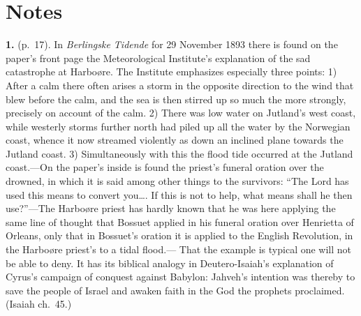 \documentclass[12pt,a4paper]{book}
\newcommand{\opage}[1]{\marginnote{\footnotesize\textit{[#1]}}}
\begin{document}
\chapter*{Notes}
\label{ch:notes}


\newcommand{\note}[1]{\medskip\noindent\textbf{#1.}\quad\ignorespaces}

\note{1}
\opage{245}(p.~17). In \emph{Berlingske Tidende} for 29 November 1893 there is found on the paper's
front page the Meteorological Institute's explanation of the sad catastrophe at Harboøre.
The Institute emphasizes especially three points: 1) After a calm there often arises a
storm in the opposite direction to the wind that blew before the calm, and the sea is then
stirred up so much the more strongly, precisely on account of the calm. 2) There was low
water on Jutland's west coast, while westerly storms further north had piled up all the
water by the Norwegian coast, whence it now streamed violently as down an inclined plane
towards the Jutland coast. 3) Simultaneously with this the flood tide occurred at the
Jutland coast.---On the paper's inside is found the priest's funeral oration over the
drowned, in which it is said among other things to the survivors: ``The Lord has used this
means to convert you\ldots. If this is not to help, what means shall he then use?''---The
Harboøre priest has hardly known that he was here applying the same line of thought that
Bossuet applied in his funeral oration over Henrietta of Orleans, only that in Bossuet's
oration it is applied to the English Revolution, in the Harboøre priest's to a tidal flood.---%
That the example is typical one will not be able to deny. It has its biblical analogy in
Deutero-Isaiah's explanation of Cyrus's campaign of conquest against Babylon: Jahveh's
intention was thereby to save the people of Israel and awaken faith in the God the prophets
proclaimed. (Isaiah ch.~45.)
\end{document}

